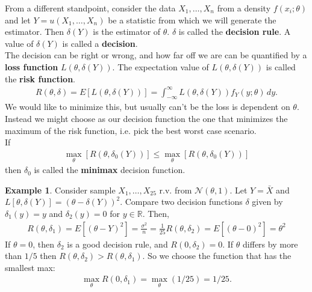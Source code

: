 \documentclass{book}
\theoremstyle{definition}
\newtheorem{exmp}{Example}[section]
\newcommand{\N}{\mathcal{N}}
\newcommand{\f}[2]{\frac{#1}{#2}}
\begin{document}
From a different standpoint, consider the data $X_1,\dots,X_n$ from a density $f(x_i;\theta)$ and let $Y = u(X_1,\dots,X_n)$ be a statistic from which we will generate the estimator. Then $\delta(Y)$  is the estimator of $\theta$. $\delta$ is called the \textbf{decision rule}. A value of $\delta(Y)$ is called a \textbf{decision}. \\

The decision can be right or wrong, and how far off we are can be quantified by a \textbf{loss function} $L(\theta,\delta(Y))$. The expectation value of $L(\theta, \delta(Y))$ is called the \textbf{risk function}. 
\begin{align}
R(\theta, \delta) = E [L(\theta,\delta(Y))] = \int^\infty_{-\infty} L(\theta,\delta(Y)) f_Y(y;\theta)\,dy.
\end{align} 
We would like to minimize this, but usually can't be the loss is dependent on $\theta$. Instead we might choose as our decision function the one that minimizes the maximum of the risk function, i.e. pick the best worst case scenario. \\

If 
\begin{align}
\boxed{\max_\theta [R(\theta,\delta_0(Y))] \leq \max_\theta [R(\theta,\delta_0(Y))]}
\end{align}
then $\delta_0$ is called the \textbf{minimax} decision function. 




\begin{exmp}
	Consider sample $X_1,\dots,X_{25}$ r.v. from $\N(\theta,1)$. Let $Y = \bar{X}$ and $L[\theta,\delta(Y)] = (\theta - \delta(Y))^2$. Compare two decision functions $\delta$ given by $\delta_1(y) = y$ and $\delta_2(y) = 0$ for $y\in \mathbb{R}$. Then,
	\begin{align}
	R(\theta, \delta_1) = E[(\theta - Y)^2]  = \f{\sigma^2}{n} = \f{1}{25}
	R(\theta, \delta_2) = E[(\theta - 0)^2] = \theta^2
	\end{align}
	If $\theta = 0$, then $\delta_2$ is a good decision rule, and $R(0,\delta_2) = 0$. If $\theta$ 	differs by more than $1/5$ then $R(\theta,\delta_2) > R(\theta,\delta_1)$. So we choose the function that has the smallest max:
	\begin{align}
	\max_\theta R(0,\delta_1) = \max_\theta (1/25) = 1/25.
	\end{align} 	

	
	
\end{exmp}
\end{document}
